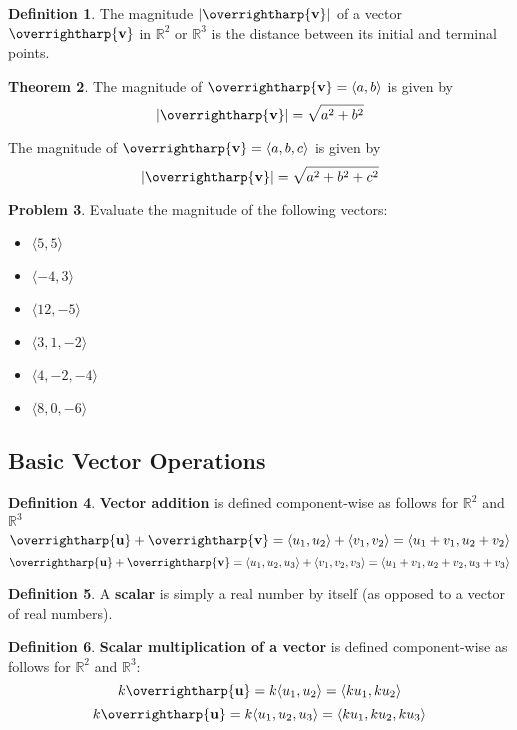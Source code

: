 \documentclass[letterpaper, twoside, 12pt]{book}
\newcommand{\<}{\langle}
\renewcommand{\>}{\rangle}
\theoremstyle{definition}
\newtheorem{theorem}{Theorem}
\theoremstyle{definition}
\newtheorem{definition}[theorem]{Definition}
\newtheorem{problem}[theorem]{Problem}
\newcommand{\harpvec}[1]{\overrightharp{\ensuremath{\mathbf{#1}}}}
\begin{document}
\vfill

\begin{definition}
  The magnitude $|\harpvec{v}|$ of a vector $\harpvec{v}$ in $\mathbb{R}^2$ or
  $\mathbb{R}^3$ is the distance between its initial and terminal points.
\end{definition}

\begin{theorem}
  The magnitude of $\harpvec{v}=\<a,b\>$ is given by
    \[|\harpvec{v}|=\sqrt{a^2+b^2}\]

  The magnitude of $\harpvec{v}=\<a,b,c\>$ is given by
    \[|\harpvec{v}|=\sqrt{a^2+b^2+c^2}\]
\end{theorem}

\newpage

\begin{problem}
  Evaluate the magnitude of the following vectors:
  \begin{itemize}
    \item $\<5,5\>$
    \item $\<-4,3\>$
    \item $\<12,-5\>$
    \item $\<3,1,-2\>$
    \item $\<4,-2,-4\>$
    \item $\<8,0,-6\>$
  \end{itemize}
\end{problem}

\vfill

\subsection{Basic Vector Operations}

\begin{definition}
  \textbf{Vector addition} is defined component-wise as follows for
  $\mathbb{R}^2$ and $\mathbb{R}^3$
  \[
    \harpvec{u}+\harpvec{v}
      =
    \<u_1,u_2\>+\<v_1,v_2\>
      =
    \<u_1+v_1,u_2+v_2\>
  \]
  \[
    \harpvec{u}+\harpvec{v}
      =
    \<u_1,u_2,u_3\>+\<v_1,v_2,v_3\>
      =
    \<u_1+v_1,u_2+v_2,u_3+v_3\>
  \]
\end{definition}

\begin{definition}
  A \textbf{scalar} is simply a real number by itself
  (as opposed to a vector of real numbers).
\end{definition}

\begin{definition}
  \textbf{Scalar multiplication of a vector} is defined component-wise as
  follows for $\mathbb{R}^2$ and $\mathbb{R}^3$:
  \[
    k\harpvec{u}
      =
    k\<u_1,u_2\>
      =
    \<ku_1,ku_2\>
  \]
  \[
    k\harpvec{u}
      =
    k\<u_1,u_2,u_3\>
      =
    \<ku_1,ku_2,ku_3\>
  \]
\end{definition}
\end{document}
